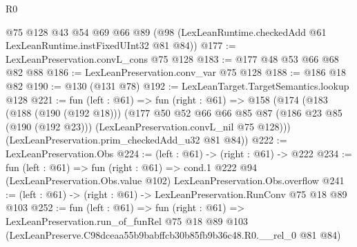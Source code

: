 \begin{lexlean}{R0}
\begin{coremodule}
    @75
    @128
    @43
    @54
    @69
    @66
    @89
    (@98 (LexLeanRuntime.checkedAdd @61 LexLeanRuntime.instFixedUInt32 @81 @84))
@177 := LexLeanPreservation.convL_cons @75 @128
@183 := @177 @48 @53 @66 @68 @82 @88
@186 := LexLeanPreservation.conv_var @75 @128
@188 := @186 @18 @82
@190 := @130 (@131 @78)
@192 := LexLeanTarget.TargetSemantics.lookup @128
@221 := fun (left : @61) =>
  fun (right : @61) =>
  @158
    (@174
      (@183
        (@188 (@190 (@192 @18)))
        (@177
          @50
          @52
          @66
          @66
          @85
          @87
          (@186 @23 @85 (@190 (@192 @23)))
          (LexLeanPreservation.convL_nil @75 @128)))
      (LexLeanPreservation.prim_checkedAdd_u32 @81 @84))
@222 := LexLeanPreservation.Obs
@224 := (left : @61) -> (right : @61) -> @222
@234 := fun (left : @61) =>
  fun (right : @61) =>
  cond.{1} @222 @94 (LexLeanPreservation.Obs.value @102) LexLeanPreservation.Obs.overflow
@241 := (left : @61) -> (right : @61) -> LexLeanPreservation.RunConv @75 @18 @89 @103
@252 := fun (left : @61) =>
  fun (right : @61) =>
  LexLeanPreservation.run_of_funRel
    @75
    @18
    @89
    @103
    (LexLeanPreserve.C98dceaa55b9babffcb30b85fb9b36c48.R0.__rel_0 @81 @84)
\end{coremodule}
\end{lexlean}
